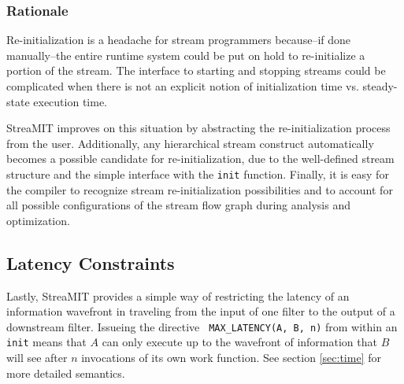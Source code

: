 \subsubsection{Rationale}

Re-initialization is a headache for stream programmers because--if
done manually--the entire runtime system could be put on hold to
re-initialize a portion of the stream.  The interface to starting and
stopping streams could be complicated when there is not an explicit
notion of initialization time vs. steady-state execution time.

StreaMIT improves on this situation by abstracting the
re-initialization process from the user.  Additionally, any
hierarchical stream construct automatically becomes a possible
candidate for re-initialization, due to the well-defined stream
structure and the simple interface with the {\tt init} function.
Finally, it is easy for the compiler to recognize stream
re-initialization possibilities and to account for all possible
configurations of the stream flow graph during analysis and optimization.

\subsection{Latency Constraints}

Lastly, StreaMIT provides a simple way of restricting the latency of
an information wavefront in traveling from the input of one filter to
the output of a downstream filter.  Issueing the directive {\tt
MAX\_LATENCY(A, B, n)} from within an {\tt init} means that $A$ can
only execute up to the wavefront of information that $B$ will see
after $n$ invocations of its own work function.  See section
\ref{sec:time} for more detailed semantics.
